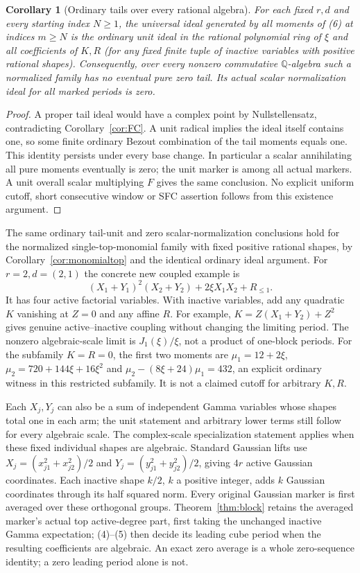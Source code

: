 \documentclass[11pt]{article}
\newtheorem{corollary}[theorem]{Corollary}
\newcommand{\Q}{\mathbb Q}
\begin{document}
\begin{corollary}[Ordinary tails over every rational algebra]\label{cor:rings}
For each fixed $r,d$ and every starting index $N\geq1$, the universal
ideal generated by all moments of (6) at indices $m\geq N$ is the
\emph{ordinary unit ideal} in the rational polynomial ring of $\xi$ and
all coefficients of $K,R$ (for any fixed finite tuple of inactive
variables with positive rational shapes). Consequently, over every nonzero commutative
$\Q$-algebra such a normalized family has no eventual pure zero tail.
Its actual scalar normalization ideal for all marked periods is zero.
\end{corollary}
\begin{proof}
A proper tail ideal would have a complex point by Nullstellensatz,
contradicting Corollary~\ref{cor:FC}. A unit radical implies the ideal
itself contains one, so some finite ordinary Bezout combination of
the tail moments equals one. This identity persists under every base
change. In particular a scalar annihilating all pure moments eventually
is zero; the unit marker is among all actual markers. A unit overall
scalar multiplying $F$ gives the same conclusion. No explicit uniform
cutoff, short consecutive window or SFC assertion follows from this
existence argument.
\end{proof}
The same ordinary tail-unit and zero scalar-normalization conclusions
hold for the normalized single-top-monomial family with fixed positive
rational shapes, by Corollary~\ref{cor:monomialtop} and the identical
ordinary ideal argument.
For $r=2,d=(2,1)$ the concrete new coupled example is
\[
 (X_1+Y_1)^2(X_2+Y_2)+2\xi X_1X_2+R_{\leq1}.       \tag{7}
\]
It has four active factorial variables. With inactive variables, add
any quadratic $K$ vanishing at $Z=0$ and any affine $R$. For example,
$K=Z(X_1+Y_2)+Z^2$ gives genuine active--inactive coupling without
changing the limiting period.
The nonzero algebraic-scale limit is $J_1(\xi)/\xi$, not a product of
one-block periods.
For the subfamily $K=R=0$, the first two moments are
$\mu_1=12+2\xi$, $\mu_2=720+144\xi+16\xi^2$ and
$\mu_2-(8\xi+24)\mu_1=432$, an explicit ordinary witness in this
restricted subfamily. It is not a claimed cutoff for arbitrary $K,R$.

Each $X_j,Y_j$ can also be a sum of independent Gamma variables whose
shapes total one in each arm; the unit statement and arbitrary lower
terms still follow for every algebraic scale. The complex-scale
specialization statement applies when these fixed individual shapes are
algebraic. Standard Gaussian lifts use
$X_j=(x_{j1}^2+x_{j2}^2)/2$ and
$Y_j=(y_{j1}^2+y_{j2}^2)/2$, giving $4r$ active Gaussian coordinates.
Each inactive shape $k/2$, $k$ a positive integer, adds $k$ Gaussian
coordinates through its half squared norm.
Every original Gaussian marker is first averaged over these orthogonal
groups. Theorem~\ref{thm:block} retains the averaged marker's actual top
active-degree part, first taking the unchanged inactive Gamma
expectation; (4)--(5) then decide its leading cube period when the
resulting coefficients are algebraic.
An exact zero average is a whole zero-sequence identity; a zero leading
period alone is not.
\end{document}
